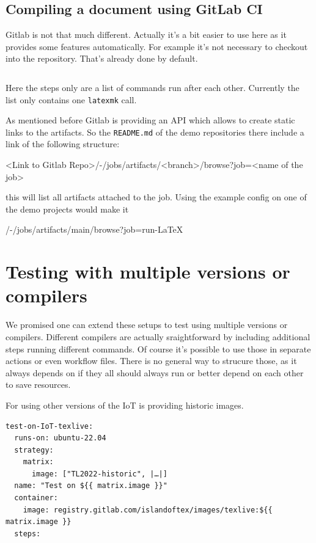 \documentclass[final]{ltugboat}
\newcommand*{\TeXLive}{\acro{\TeX\,Live}}
\newcommand*{\command}[1]{\texttt{#1}}
\newcommand*{\file}[1]{\texttt{#1}}
\begin{document}
\subsection{Compiling a document using GitLab CI}

Gitlab is not that much different. Actually it's a bit easier to use here as it provides some features automatically.
For example it's not necessary to checkout into the repository.
That's already done by default.

\inputminted[breaklines,breakafter=/]{yaml}{examples/latex-basic-gitlab.yml}

Here the steps only are a list of commands run after each other. Currently the list only contains one \command{latexmk} call.

As mentioned before Gitlab is providing an API which allows to create static links to the artifacts.
So the \file{README.md} of the demo repositories there include a link of the following structure:

<Link to Gitlab Repo>/-/jobs/artifacts/<branch>/browse?job=<name of the job>

this will list all artifacts attached to the job.
Using the example config on one of the demo projects would make it

/-/jobs/artifacts/main/browse?job=run-LaTeX

\section{Testing with multiple versions or compilers}

We promised one can extend these setups to test using multiple versions or compilers.
Different compilers are actually sraightforward by including additional steps running different commands.
Of course it's possible to use those in separate actions or even workflow files.
There is no general way to strucure those, as it always depends on if they all should always run or better depend on each other to save resources.

For using other versions of \TeXLive{} the IoT is providing historic images.

\begin{verbatim}
test-on-IoT-texlive:
  runs-on: ubuntu-22.04
  strategy:
    matrix:
      image: ["TL2022-historic", |…|]
  name: "Test on ${{ matrix.image }}"
  container:
    image: registry.gitlab.com/islandoftex/images/texlive:${{ matrix.image }}
  steps:
\end{verbatim}
\end{document}
